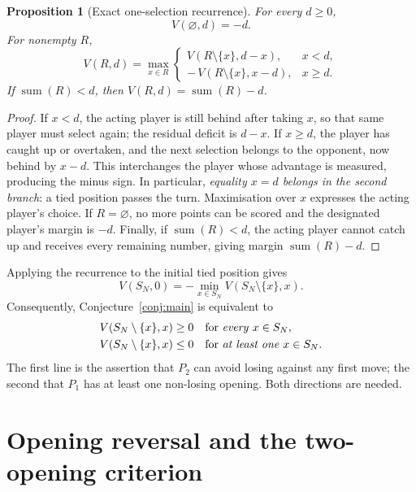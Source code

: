 \documentclass[11pt,a4paper]{article}
\newtheorem{proposition}[theorem]{Proposition}
\theoremstyle{definition}
\theoremstyle{remark}
\newcommand{\SN}{S_N}
\newcommand{\sm}{\operatorname{sum}}
\begin{document}
\begin{proposition}[Exact one-selection recurrence]
\label{prop:recurrence}
For every $d\ge0$,
\begin{equation}\label{eq:terminal}
V(\varnothing,d)=-d.
\end{equation}
For nonempty $R$,
\begin{equation}\label{eq:recursion}
\boxed{
V(R,d)=\max_{x\in R}
\begin{cases}
V(R\setminus\{x\},d-x),&x<d,\\[2pt]
-\,V(R\setminus\{x\},x-d),&x\ge d.
\end{cases}}
\end{equation}
If $\sm(R)<d$, then $V(R,d)=\sm(R)-d$.
\end{proposition}
\begin{proof}
If $x<d$, the acting player is still behind after taking $x$,
so that same player must select again; the residual deficit is $d-x$.
If $x\ge d$, the player has caught up or overtaken, and the next
selection belongs to the opponent, now behind by $x-d$.  This
interchanges the player whose advantage is measured, producing the
minus sign.  In particular, \emph{equality $x=d$ belongs in the
second branch}: a tied position passes the turn.  Maximisation over
$x$ expresses the acting player's choice.  If $R=\varnothing$, no
more points can be scored and the designated player's margin is $-d$.
Finally, if $\sm(R)<d$, the acting player cannot catch up and receives
every remaining number, giving margin $\sm(R)-d$.
\end{proof}

Applying the recurrence to the initial tied position gives
\begin{equation}\label{eq:openingvalue}
V(\SN,0)=-\min_{x\in\SN}V(\SN\setminus\{x\},x).
\end{equation}
Consequently, Conjecture~\ref{conj:main} is equivalent to
\begin{align}
V(\SN\setminus\{x\},x)&\ge0
          &&\text{for \emph{every} }x\in\SN,\label{eq:all-opening}\\
V(\SN\setminus\{x\},x)&\le0
          &&\text{for \emph{at least one} }x\in\SN.\label{eq:one-opening}
\end{align}
The first line is the assertion that $P_2$ can avoid losing against
any first move; the second that $P_1$ has at least one non-losing
opening.  Both directions are needed.

\section{Opening reversal and the two-opening criterion}
\end{document}
